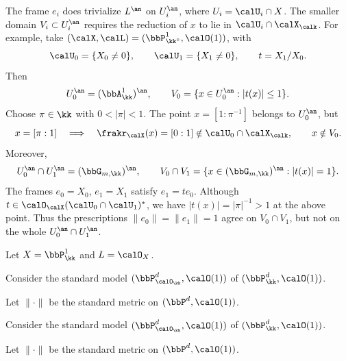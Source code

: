 \begin{remark}[label=\labelNFM{rmk:generic-fiber-and-reduction-domains}, status=draft, tag=0000000]
	\leavevmode\par
	\begin{latexmathchange}
		The frame $e_i$ does trivialize $L^\an$ on $U_i^\an$, where $U_i = \calU_i\cap X$.
		The smaller domain $V_i \subset U_i^\an$ requires the reduction of $x$ to lie in $\calU_i\cap\calX_\calk$.
		For example, take $(\calX,\calL) = (\bbP^1_{\kk^\circ},\calO(1))$, with
		\[ \calU_0 = \{X_0 \ne 0\}, \qquad \calU_1 = \{X_1 \ne 0\}, \qquad t = X_1/X_0. \]
		Then
		\[ U_0^\an = (\bbA^1_\kk)^\an, \qquad V_0 = \{x \in U_0^\an : |t(x)| \leq 1\}. \]
		Choose $\pi \in \kk$ with $0 < |\pi| < 1$.
		The point $x = [1:\pi^{-1}]$ belongs to $U_0^\an$, but
		\[ x = [\pi:1] \quad\Longrightarrow\quad \frakr_\calX(x) = [0:1] \notin \calU_0\cap\calX_\calk, \qquad x \notin V_0. \]
		Moreover,
		\[ U_0^\an\cap U_1^\an = (\bbG_{m,\kk})^\an, \qquad V_0\cap V_1 = \{x \in (\bbG_{m,\kk})^\an : |t(x)| = 1\}. \]
		The frames $e_0 = X_0$, $e_1 = X_1$ satisfy $e_1 = te_0$.
		Although $t \in \calO_\calX(\calU_0\cap\calU_1)^*$, we have $|t(x)| = |\pi|^{-1} > 1$ at the above point.
		Thus the prescriptions $\|e_0\| = \|e_1\| = 1$ agree on $V_0\cap V_1$, but not on the whole $U_0^\an\cap U_1^\an$.
	\end{latexmathchange}
\end{remark}

\begin{example}[label=\labelNFM{eg:model-metric-by-standard-p1-and-blowup}, status=draft, tag=0000000]
	Let $X = \bbP^1_\kk$ and $L = \calO_X$.



	Consider the standard model $(\bbP^d_{\calO_\kk},\calO(1))$ of $(\bbP^d_{\kk},\calO(1))$.


	Let $\|\cdot\|$ be the standard metric on $(\bbP^d,\calO(1))$.

	\Yang{}
\end{example}

\begin{example}[label=\labelNFM{eg:standard-metric-are-model-metric}, status=draft, tag=0000000]
	Consider the standard model $(\bbP^d_{\calO_\kk},\calO(1))$ of $(\bbP^d_{\kk},\calO(1))$.


	Let $\|\cdot\|$ be the standard metric on $(\bbP^d,\calO(1))$.

	\Yang{}
\end{example}

